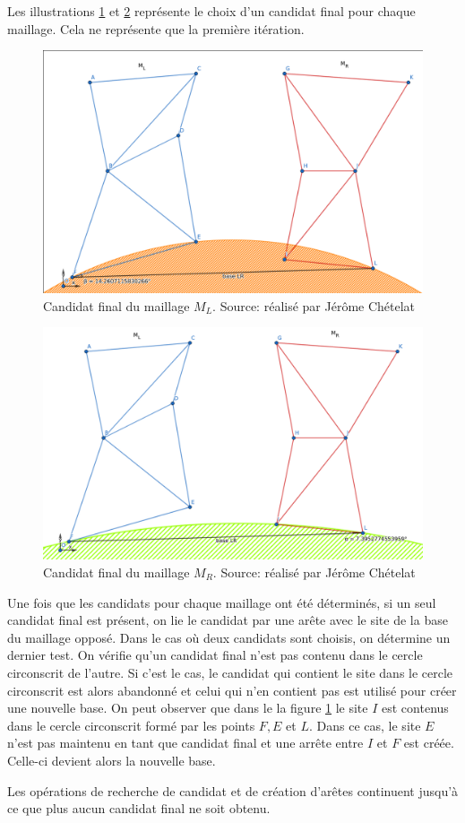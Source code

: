 Les illustrations \ref{fig:site_ML_candidate} et \ref{fig:site_MR_candidate} représente le choix d'un candidat final pour chaque maillage. Cela ne représente que la première itération.
\begin{figure}[htbp!]
    \centering
    \includegraphics[width=0.8\linewidth]{figures/site_ML.png}
    \caption{Candidat final du maillage $M_L$. Source: réalisé par Jérôme Chételat}
    \label{fig:site_ML_candidate}
\end{figure}

\begin{figure}[htpb!]
    \centering
    \includegraphics[width=0.8\linewidth]{figures/site_MR.png}
    \caption{Candidat final du maillage $M_R$. Source: réalisé par Jérôme Chételat}
    \label{fig:site_MR_candidate}
\end{figure}

Une fois que les candidats pour chaque maillage ont été déterminés, si un seul candidat final est présent, on lie le candidat par une arête avec le site de la base du maillage opposé. Dans le cas où deux candidats sont choisis, on détermine un dernier test. On vérifie qu'un candidat final n'est pas contenu dans le cercle circonscrit de l'autre. Si c'est le cas, le candidat qui contient le site dans le cercle circonscrit est alors abandonné et celui qui n'en contient pas est utilisé pour créer une nouvelle base. On peut observer que dans le la figure \ref{fig:site_ML_candidate} le site $I$ est contenus dans le cercle circonscrit formé par les points $F, E$ et $L$. Dans ce cas, le site $E$ n'est pas maintenu en tant que candidat final et une arrête entre $I$ et $F$ est créée. Celle-ci devient alors la nouvelle base.

Les opérations de recherche de candidat et de création d'arêtes continuent jusqu'à ce que plus aucun candidat final ne soit obtenu.